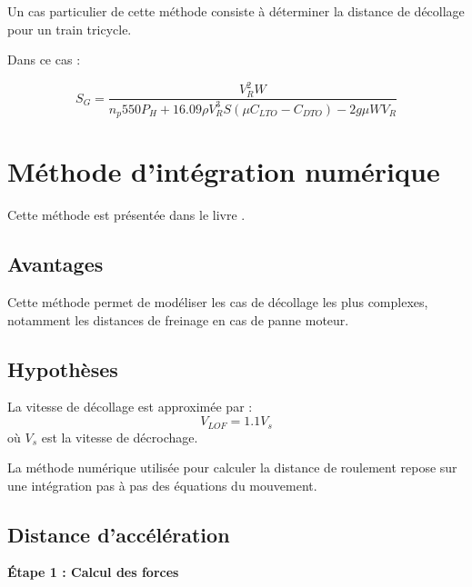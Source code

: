 				\vspace{0.3cm}
				
				Un cas particulier de cette méthode consiste à déterminer la distance de décollage pour un train tricycle.
				
				Dans ce cas :
				
				\begin{equation*}
					S_G=	\frac{	V_R^2 W	}{	n_p 550 P_H		+	16.09\rho V_R^3 S 	(\mu C_{LTO}-C_{DTO})	-	2g\mu W V_R		}
				\end{equation*}
			
		\section{  Méthode d’intégration numérique}
			Cette méthode est présentée dans le livre \cite{smi:60}.
		
			\subsection{Avantages}
			
				Cette méthode permet de modéliser les cas de décollage les plus complexes, notamment les distances de freinage en cas de panne moteur.
			
				\vspace{0.3cm}
				
			\subsection{Hypothèses}
			
				La vitesse de décollage est approximée par :	\[	V_{LOF}=1.1V_s	\]	où $V_s$ est la vitesse de décrochage.
				
				\vspace{0.3cm}
				
		
				
				La méthode numérique utilisée pour calculer la distance de roulement repose sur une intégration pas à pas des équations du mouvement.
				
				
				
			\subsection{Distance d'accélération }
				\textbf{Étape 1 : Calcul des forces} 
				
